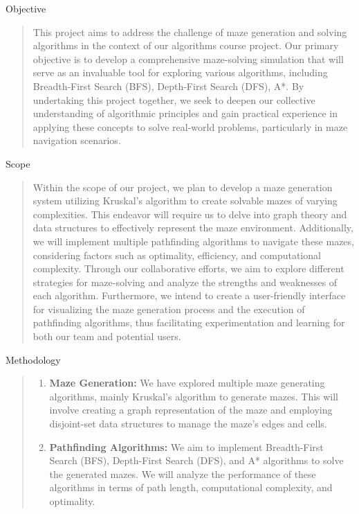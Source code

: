 \documentclass{amsart}
\begin{document}
\begin{section}{Objective}
    \begin{quote}
        This project aims to address the challenge of maze generation and solving algorithms in the context of our algorithms course project. Our primary objective is to develop a comprehensive maze-solving simulation that will serve as an invaluable tool for exploring various algorithms, including Breadth-First Search (BFS), Depth-First Search (DFS), A*. By undertaking this project together, we seek to deepen our collective understanding of algorithmic principles and gain practical experience in applying these concepts to solve real-world problems, particularly in maze navigation scenarios.
    \end{quote}
\end{section}

\pagebreak

\begin{section}{Scope}
    \begin{quote}
        Within the scope of our project, we plan to develop a maze generation system utilizing Kruskal's algorithm to create solvable mazes of varying complexities. This endeavor will require us to delve into graph theory and data structures to effectively represent the maze environment. Additionally, we will implement multiple pathfinding algorithms to navigate these mazes, considering factors such as optimality, efficiency, and computational complexity. Through our collaborative efforts, we aim to explore different strategies for maze-solving and analyze the strengths and weaknesses of each algorithm. Furthermore, we intend to create a user-friendly interface for visualizing the maze generation process and the execution of pathfinding algorithms, thus facilitating experimentation and learning for both our team and potential users.
    \end{quote}
\end{section}

\begin{section}{Methodology}
    \begin{quote}
        \begin{enumerate}
            \item \textbf{Maze Generation:} We have explored multiple maze generating algorithms, mainly Kruskal's algorithm to generate mazes. This will involve creating a graph representation of the maze and employing disjoint-set data structures to manage the maze's edges and cells. 
            \item \textbf{Pathfinding Algorithms:} We aim to implement Breadth-First Search (BFS), Depth-First Search (DFS), and A* algorithms to solve the generated mazes. We will analyze the performance of these algorithms in terms of path length, computational complexity, and optimality.
        \end{enumerate}
    \end{quote}
\end{section}
\end{document}
